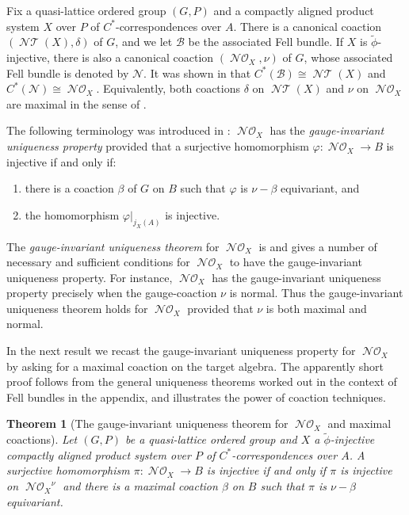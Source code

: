 \documentclass[12pt]{amsart}
\theoremstyle{plain}
\newtheorem{theorem}{Theorem}[section]
\theoremstyle{remark}
\theoremstyle{definition}
\numberwithin{equation}{section}
\theoremstyle{plain}
\theoremstyle{definition}
\theoremstyle{remark}
\begin{document}
Fix a quasi-lattice ordered group $(G,P)$ and a compactly aligned product system $X$
over $P$ of $C^*$-correspondences over $A$. There is a canonical coaction $({\operatorname{\mathcal{NT}}}(X),\delta)$ of $G$, and we let
$\mathcal{B}$ be the associated Fell bundle. If $X$ is $\tilde\phi$-injective, there is also a canonical coaction
$({\operatorname{\mathcal{NO}}_{\!{X}}},\nu)$ of $G$, whose associated Fell bundle is denoted by $\mathcal{N}$.  It was shown in \cite[Remark 4.5]{CLSV}
that $C^*(\mathcal{B})\cong {\operatorname{\mathcal{NT}}}(X)$ and $C^*(\mathcal{N})\cong {\operatorname{\mathcal{NO}}_{\!{X}}}$. Equivalently,
 both coactions $\delta$ on ${\operatorname{\mathcal{NT}}}(X)$ and $\nu$ on ${\operatorname{\mathcal{NO}}_{\!{X}}}$ are maximal in the sense of \cite{EKQ}.

The following terminology was introduced in \cite[Definition 4.10]{CLSV}: ${\operatorname{\mathcal{NO}}_{\!{X}}}$ has the \emph{gauge-invariant
uniqueness property} provided that a surjective homomorphism $\varphi:{\operatorname{\mathcal{NO}}_{\!{X}}}\to B$ is injective if
and only if:
\begin{enumerate}
\item\label{it:carries coaction} there is a coaction
    $\beta$ of $G$ on $B$ such that
    $\varphi$ is $\nu-\beta$ equivariant,
    and
\item\label{it:inj on A} the homomorphism $\varphi\vert_{j_X(A)}$ is injective.
\end{enumerate}

The \emph{gauge-invariant uniqueness theorem} for ${\operatorname{\mathcal{NO}}_{\!{X}}}$  is \cite[Corollary 4.11]{CLSV}
and gives a number of necessary
and sufficient conditions for ${\operatorname{\mathcal{NO}}_{\!{X}}}$  to have the  gauge-invariant uniqueness property. For instance, ${\operatorname{\mathcal{NO}}_{\!{X}}}$
has the gauge-invariant uniqueness property precisely when the gauge-coaction $\nu$ is normal. Thus  the gauge-invariant
uniqueness theorem holds for ${\operatorname{\mathcal{NO}}_{\!{X}}}$ provided that $\nu$ is both maximal and normal.

In the next result we recast the gauge-invariant uniqueness property for ${\operatorname{\mathcal{NO}}_{\!{X}}}$ by asking for a maximal
 coaction on the target algebra. The apparently short proof follows from the general uniqueness
 theorems worked out in the context of Fell bundles in the appendix, and illustrates the power of coaction
 techniques.

 \begin{theorem}[The gauge-invariant uniqueness theorem for ${\operatorname{\mathcal{NO}}_{\!{X}}}$ and maximal coactions]
 \label{GIUTNO}
 Let $(G,P)$ be a quasi-lattice ordered group
 and $X$ a $\tilde\phi$-injective compactly aligned product system over $P$ of $C^*$-correspondences over $A$. A surjective
homomorphism  $\pi:{\operatorname{\mathcal{NO}}_{\!{X}}}\to B$ is injective if and only if $\pi$ is injective
on ${\operatorname{\mathcal{NO}}_{\!{X}}}^\nu$ and there is
 a \emph{maximal} coaction $\beta$ on $B$ such that $\pi$ is $\nu-\beta$ equivariant.
  \end{theorem}
\end{document}
